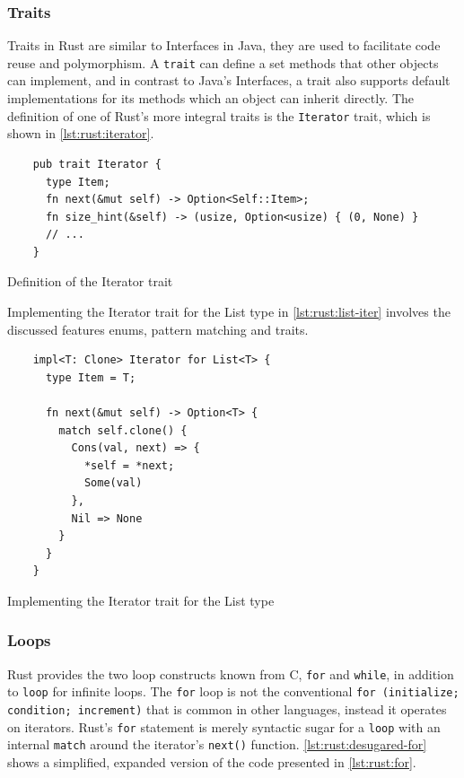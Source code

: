 \subsubsection{Traits}

Traits in Rust are similar to Interfaces in Java, they are used to facilitate code reuse and polymorphism.
A \texttt{trait} can define a set methods that other objects can implement, and in contrast to Java's Interfaces, a trait also supports default implementations for its methods which an object can inherit directly.
The definition of one of Rust's more integral traits is the \texttt{Iterator} trait, which is shown in \autoref{lst:rust:iterator}.

\begin{listing}[H]
  \begin{verbatim}
    pub trait Iterator {
      type Item;
      fn next(&mut self) -> Option<Self::Item>;
      fn size_hint(&self) -> (usize, Option<usize) { (0, None) }
      // ...
    }
  \end{verbatim}
  \caption{Definition of the Iterator trait}
  \label{lst:rust:iterator}
\end{listing}

Implementing the Iterator trait for the List type in \autoref{lst:rust:list-iter} involves the discussed features enums, pattern matching and traits.

\begin{listing}[H]
  \begin{verbatim}
    impl<T: Clone> Iterator for List<T> {
      type Item = T;

      fn next(&mut self) -> Option<T> {
        match self.clone() {
          Cons(val, next) => {
            *self = *next;
            Some(val)
          },
          Nil => None
        }
      }
    }
  \end{verbatim}
  \caption{Implementing the Iterator trait for the List type}
  \label{lst:rust:list-iter}
\end{listing}


\subsubsection{Loops}

Rust provides the two loop constructs known from C, \texttt{for} and \texttt{while}, in addition to \texttt{loop} for infinite loops.
The \texttt{for} loop is not the conventional \texttt{for (initialize; condition; increment)} that is common in other languages, instead it operates on iterators.
Rust's \texttt{for} statement is merely syntactic sugar for a \texttt{loop} with an internal \texttt{match} around the iterator's \texttt{next()} function.
\autoref{lst:rust:desugared-for} shows a simplified, expanded version of the code presented in \autoref{lst:rust:for}.

